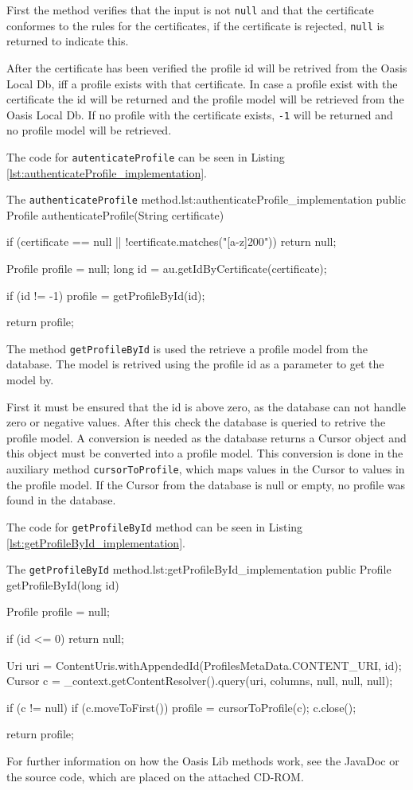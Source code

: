 First the method verifies that the input is not \texttt{null} and that the certificate conformes to the rules for the certificates, if the certificate is rejected, \texttt{null} is returned to indicate this.

After the certificate has been verified the profile id will be retrived from the Oasis Local Db, iff a profile exists with that certificate.
In case a profile exist with the certificate the id will be returned and the profile model will be retrieved from the Oasis Local Db.
If no profile with the certificate exists, \texttt{-1} will be returned and no profile model will be retrieved.

The code for \texttt{autenticateProfile} can be seen in Listing \vref{lst:authenticateProfile_implementation}.

\begin{Java}{The \texttt{authenticateProfile} method.}{lst:authenticateProfile_implementation}
public Profile authenticateProfile(String certificate) {
	if (certificate == null || !certificate.matches("[a-z]{200}")) {
		return null;
	}

	Profile profile = null;
	long id = au.getIdByCertificate(certificate);

	if (id != -1) {
		profile = getProfileById(id);
	}

	return profile;
}
\end{Java}

The method \texttt{getProfileById} is used the retrieve a profile model from the database.
The model is retrived using the profile id as a parameter to get the model by.

First it must be ensured that the id is above zero, as the database can not handle zero or negative values.
After this check the database is queried to retrive the profile model.
A conversion is needed as the database returns a Cursor object and this object must be converted into a profile model. \cite{Cursor}
This conversion is done in the auxiliary method \texttt{cursorToProfile}, which maps values in the Cursor to values in the profile model.
If the Cursor from the database is null or empty, no profile was found in the database.

The code for \texttt{getProfileById} method can be seen in Listing \vref{lst:getProfileById_implementation}.

\begin{Java}{The \texttt{getProfileById} method.}{lst:getProfileById_implementation}
public Profile getProfileById(long id) {
	Profile profile = null;
	
	if (id <= 0) {
		return null;
	}
	
	Uri uri = ContentUris.withAppendedId(ProfilesMetaData.CONTENT_URI, id);
	Cursor c = _context.getContentResolver().query(uri, columns, null, null, null);

	if (c != null) {
		if (c.moveToFirst()) {
			profile = cursorToProfile(c);
		}
		c.close();
	}

	return profile;
}
\end{Java}

For further information on how the Oasis Lib methods work, see the JavaDoc or the source code, which are placed on the attached CD-ROM. 